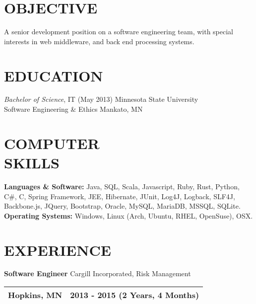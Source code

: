 \documentclass[line,margin]{res}
\begin{document}
\address{1430 Taylor Ave W, St. Paul, MN 55104}
\address{
    \Mobilefone \hspace{1 pt} (651)-285-4565 | 
    \Letter \hspace{1 pt} \href{mailto:drew@sothr.com?subject=Concerning Your Resume}{drew@sothr.com} |
    \Mundus \hspace{1 pt} \url{https://www.sothr.com}
}

\begin{resume}

\section{OBJECTIVE} 

A senior development position on a software engineering team, with special interests in web middleware, and back end processing systems. 

\section{EDUCATION} 

{\sl Bachelor of Science}, IT (May 2013) \hfill Minnesota State University \\
Software Engineering \& Ethics \hfill Mankato, MN

\section{COMPUTER \\ SKILLS} 

{\bf Languages \& Software:} Java, SQL, Scala, Javascript, 
Ruby, Rust, Python, C\#, C, Spring Framework, JEE, 
Hibernate, JUnit, Log4J, Logback, SLF4J, 
Backbone.js, JQuery, Bootstrap, 
Oracle, MySQL, MariaDB, MSSQL, SQLite. \\
{\bf Operating Systems:} Windows, Linux (Arch, Ubuntu, RHEL, OpenSuse), OSX.

\section{EXPERIENCE}

{\bf Software Engineer} \hfill Cargill Incorporated, Risk Management \\
\begin{tabular*}{1.0\linewidth}{@{}c@{\extracolsep{\fill}}r@{}}
Hopkins, MN & 2013 - 2015 (2 Years, 4 Months) \\
\hline
\end{tabular*}


\end{resume}
\end{document}
